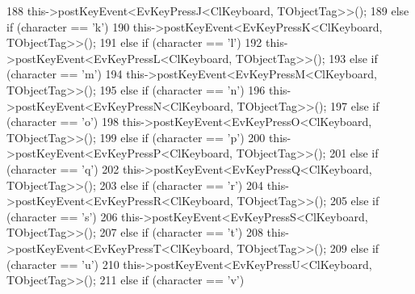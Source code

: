 \begin{DoxyCode}
{188                                 this->postKeyEvent<EvKeyPressJ<ClKeyboard, TObjectTag>>();
189                         \textcolor{keywordflow}{else} \textcolor{keywordflow}{if} (character == \textcolor{charliteral}{'k'})
190                                 this->postKeyEvent<EvKeyPressK<ClKeyboard, TObjectTag>>();
191                         \textcolor{keywordflow}{else} \textcolor{keywordflow}{if} (character == \textcolor{charliteral}{'l'})
192                                 this->postKeyEvent<EvKeyPressL<ClKeyboard, TObjectTag>>();
193                         \textcolor{keywordflow}{else} \textcolor{keywordflow}{if} (character == \textcolor{charliteral}{'m'})
194                                 this->postKeyEvent<EvKeyPressM<ClKeyboard, TObjectTag>>();
195                         \textcolor{keywordflow}{else} \textcolor{keywordflow}{if} (character == \textcolor{charliteral}{'n'})
196                                 this->postKeyEvent<EvKeyPressN<ClKeyboard, TObjectTag>>();
197                         \textcolor{keywordflow}{else} \textcolor{keywordflow}{if} (character == \textcolor{charliteral}{'o'})
198                                 this->postKeyEvent<EvKeyPressO<ClKeyboard, TObjectTag>>();
199                         \textcolor{keywordflow}{else} \textcolor{keywordflow}{if} (character == \textcolor{charliteral}{'p'})
200                                 this->postKeyEvent<EvKeyPressP<ClKeyboard, TObjectTag>>();
201                         \textcolor{keywordflow}{else} \textcolor{keywordflow}{if} (character == \textcolor{charliteral}{'q'})
202                                 this->postKeyEvent<EvKeyPressQ<ClKeyboard, TObjectTag>>();
203                         \textcolor{keywordflow}{else} \textcolor{keywordflow}{if} (character == \textcolor{charliteral}{'r'})
204                                 this->postKeyEvent<EvKeyPressR<ClKeyboard, TObjectTag>>();
205                         \textcolor{keywordflow}{else} \textcolor{keywordflow}{if} (character == \textcolor{charliteral}{'s'})
206                                 this->postKeyEvent<EvKeyPressS<ClKeyboard, TObjectTag>>();
207                         \textcolor{keywordflow}{else} \textcolor{keywordflow}{if} (character == \textcolor{charliteral}{'t'})
208                                 this->postKeyEvent<EvKeyPressT<ClKeyboard, TObjectTag>>();
209                         \textcolor{keywordflow}{else} \textcolor{keywordflow}{if} (character == \textcolor{charliteral}{'u'})
210                                 this->postKeyEvent<EvKeyPressU<ClKeyboard, TObjectTag>>();
211                         \textcolor{keywordflow}{else} \textcolor{keywordflow}{if} (character == \textcolor{charliteral}{'v'})
}
\end{DoxyCode}

